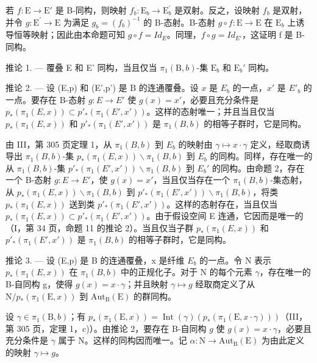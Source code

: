 若 \(f\colon \mathrm{E}\to \mathrm{E}'\) 是 B-同构，则映射 \(f_{b}\colon \mathrm{E}_{b}\to \mathrm{E}_{b}^{\prime}\) 是双射。反之，设映射 \(f_{b}\) 是双射，并令 \(g\colon \mathrm{E}^{\prime}\to \mathrm{E}\) 为满足 \(g_{b} = (f_{b})^{-1}\) 的 B-态射。B-态射 \(g\circ f\colon \mathrm{E}\to \mathrm{E}\) 在 \(\mathrm{E}_b\) 上诱导恒等映射；因此由本命题可知 \(g \circ f = Id_{E}\)。同理，\(f \circ g = Id_{E'}\)，这证明 f 是 B-同构。

推论 1. --- 覆叠 E 和 E' 同构，当且仅当 \(\pi_1(\mathrm{B},b)\)-集 \(\mathrm{E}_b\) 和 \(\mathrm{E}_b'\) 同构。

推论 2. --- 设 (E,p) 和 (E',p') 是 B 的连通覆叠。设 \(x\) 是 \(E_{b}\) 的一点，\(x'\) 是 \(E'_{b}\) 的一点。要存在 B-态射 \(g\colon E\to E'\) 使 \(g(x)=x'\)，必要且充分条件是 \(p_{*}(\pi_{1}(E,x))\subset p'_{*}(\pi_{1}(E',x'))\)。这样的态射唯一；并且当且仅当 \(p_{*}(\pi_{1}(E,x))\) 和 \(p'_{*}(\pi_{1}(E',x'))\) 是 \(\pi_{1}(B,b)\) 的相等子群时，它是同构。

由 III，第 305 页定理 1，从 \(\pi_1(B,b)\) 到 \(E_b\) 的映射由 \(\gamma \mapsto x \cdot \gamma\) 定义，经取商诱导出 \(\pi_1(B,b)\)-集 \(p_*(\pi_1(E,x)) \backslash \pi_1(B,b)\) 到 \(E_b\) 的同构。同样，存在唯一的从 \(\pi_1(B,b)\)-集 \(p'_{*}(\pi_1(E',x')) \backslash \pi_1(B,b)\) 到 \(E_b'\) 的同构。由命题 2，存在一个 B-态射 \(g\colon E\to E'\)，使 \(g(x)=x'\)，当且仅当存在一个 \(\pi_1(B,b)\)-集态射，从 \(p_*(\pi_1(E,x)) \backslash \pi_1(B,b)\) 到 \(p'_{*}(\pi_1(E',x')) \backslash \pi_1(B,b)\)，将类 \(p_*(\pi_1(E,x))\) 送到类 \(p'_{*}(\pi_1(E',x'))\)。这样的态射存在，当且仅当 \(p_*(\pi_1(E,x)) \subset p'_{*}(\pi_1(E',x'))\)。由于假设空间 E 连通，它因而是唯一的（I，第 34 页，命题 11 的推论 2）。当且仅当子群 \(p_*(\pi_1(E,x))\) 和 \(p'_{*}(\pi_1(E',x'))\) 是 \(\pi_1(B,b)\) 的相等子群时，它是同构。

推论 3. --- 设 (E,p) 是 B 的连通覆叠，x 是纤维 \(E_{b}\) 的一点。令 N 表示 \(p_{*}(\pi_{1}(E,x))\) 在 \(\pi_{1}(B,b)\) 中的正规化子。对于 N 的每个元素 \(\gamma\)，存在唯一的 B-自同构 g，使得 \(g(x) = x \cdot \gamma\)；并且映射 \(\gamma \mapsto g\) 经取商定义了从 \(\mathrm{N}/p_{*}(\pi_{1}(\mathrm{E},x))\) 到 \(\mathrm{Aut}_{\mathrm{B}}(\mathrm{E})\) 的群同构。

设 \(\gamma \in \pi_1(\mathrm{B}, b)\)；有 \(p_*(\pi_1(\mathrm{E}, x)) = \operatorname{Int}(\gamma)(p_*(\pi_1(\mathrm{E}, x \cdot \gamma)))\)（III，第 305 页，定理 1，c)）。由推论 2，要存在 B-自同构 \(g\) 使 \(g(x) = x \cdot \gamma\)，必要且充分条件是 \(\gamma\) 属于 N。这样的同构因而唯一。记 \(\alpha: \mathrm{N} \to \mathrm{Aut}_{\mathrm{B}}(\mathrm{E})\) 为由此定义的映射 \(\gamma \mapsto g\)。

